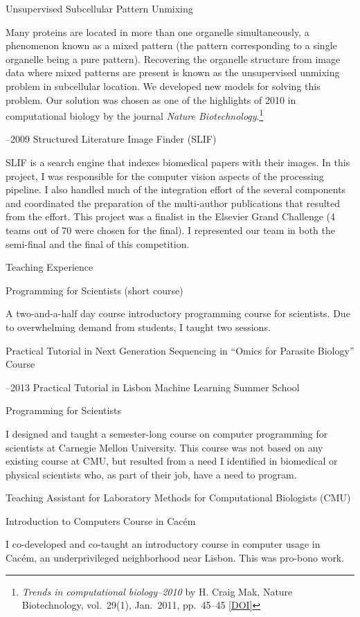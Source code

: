\documentclass{article}
\renewcommand\section[1]{%
    \par\vspace{2em}\penalty-100%
    {\subhead #1}%
    \par\penalty100\vspace{1em}\penalty100%
}
\newcommand\cvitem[2][\relax]{%
    \par\vspace{.8em}
    \if\relax#1\else{\Date \textcolor{medg}{#1}}\hspace{1em}\fi%
    {\CvItem #2}%
    \par\vspace{.4em}
}
\newcommand\showdoi[1]{%
    \href{http://dx.doi.org/#1}{[DOI]}%
}
\begin{document}
\cvitem[2010]{Unsupervised Subcellular Pattern Unmixing}
Many proteins are located in more than one organelle simultaneously, a
phenomenon known as a mixed pattern (the pattern corresponding to a single
organelle being a pure pattern). Recovering the organelle structure from image
data where mixed patterns are present is known as the unsupervised unmixing
problem in subcellular location. We developed new models for
solving this problem. Our solution was chosen as one of the highlights of 2010
in computational biology by the journal \emph{Nature Biotechnology}.\footnote{%
\emph{Trends in computational biology--2010} by H. Craig Mak, Nature
Biotechnology, vol.\ 29(1), Jan.\ 2011, pp.\ 45--45 \showdoi{10.1038/nbt.1747}}

\cvitem[2008--2009]{Structured Literature Image Finder (SLIF)}
SLIF is a search engine that indexes biomedical papers with their images. In
this project, I was responsible for the computer vision aspects of the
processing pipeline. I also handled much of the integration effort of the
several components and coordinated the preparation of the multi-author
publications that resulted from the effort. This project was a finalist in the
Elsevier Grand Challenge (4 teams out of 70 were chosen for the final). I
represented our team in both the semi-final and the final of this competition.

\break
\section{Teaching Experience}

\cvitem[2012]{Programming for Scientists (short course)}
A two-and-a-half day course introductory programming course for scientists. Due
to overwhelming demand from students, I taught two sessions.

\cvitem[2012]{Practical Tutorial in Next Generation Sequencing in ``Omics for Parasite Biology'' Course}
\cvitem[2011--2013]{Practical Tutorial in Lisbon Machine Learning Summer School}

\cvitem[2009]{Programming for Scientists}
I designed and taught a semester-long course on computer programming for
scientists at Carnegie Mellon University. This course was not based on any
existing course at CMU, but resulted from a need I identified in biomedical or
physical scientists who, as part of their job, have a need to program.

\cvitem[2008]{Teaching Assistant for Laboratory Methods for Computational Biologists (CMU)}
\cvitem[2005]{Introduction to Computers Course in Cacém}
I co-developed and co-taught an introductory course in computer usage in
Cacém, an underprivileged neighborhood near Lisbon. This was pro-bono work.
\end{document}
